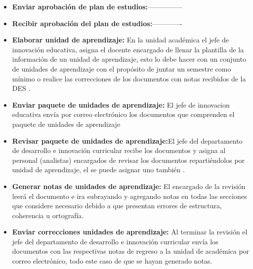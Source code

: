 \begin{itemize}
	\item \textbf{Enviar aprobación de plan de estudios:}---------------
	\item \textbf{Recibir aprobación del plan de estudios:}-------------
	\item \textbf{Elaborar unidad de aprendizaje:} En la unidad académica el jefe de innovación educativa, asigna el docente encargado de llenar la plantilla de la información de un unidad de aprendizaje, esto lo debe hacer con un conjunto de unidades de aprendizaje con el propósito de juntar un semestre como mínimo o realice las correcciones de los documentos con notas recibidos de la DES .     
	\item \textbf{Enviar paquete de  unidades de aprendizaje:} El jefe de innovacion educativa  envía por correo electrónico los documentos que comprenden el paquete de unidades de aprendizaje  
	\item \textbf{Revisar paquete de  unidades de aprendizaje:}El jefe del departamento de desarrollo e innovación curricular recibe los documentos y asigna al personal (analistas) encargados de revisar los documentos repartiéndolos por unidad de aprendizaje, el se puede asignar uno también . 
	\item \textbf{Generar notas de  unidades de aprendizaje:} El encargado de la revisión leerá el documento e ira subrayando y agregando notas en todas las secciones que considere necesario debido a que presentan errores de estructura, coherencia u ortografía.  
	\item \textbf{Enviar correcciones unidades de aprendizaje:} Al terminar la revisión el jefe del departamento de desarrollo e innovación curricular envía los documentos con las respectivas notas de regreso a la unidad de académica por correo electrónico, todo este caso de que se hayan generado notas. 
	
\end{itemize}